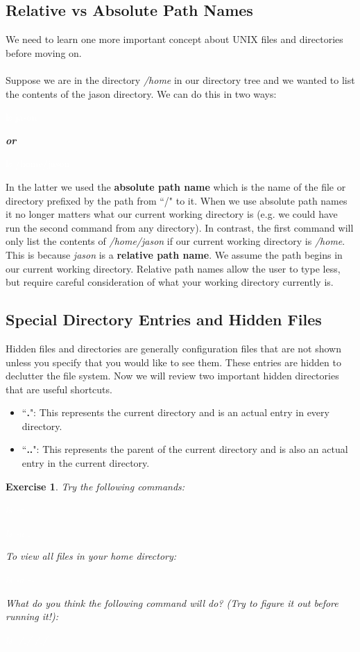\documentclass[oneside]{book}
\newcommand{\commandline}[1]{\begin{center} \colorbox{Dark}{\textcolor{white}{#1}} \end{center}}
\newtheorem{ex}{Exercise}[chapter]
\begin{document}
\subsection{Relative vs Absolute Path Names}
We need to learn one more important concept about UNIX files and directories before moving on. \\\\
Suppose we are in the directory \textit{/home} in our directory tree and we wanted to list the contents of the jason directory. We can do this in two ways:

\commandline{ls jason}
\begin{center}
    \textbf{\textit{or}}
\end{center}
\commandline{ls /home/jason}
In the latter we used the \textbf{absolute path name} which is the name of the file or directory prefixed by the path from ``/" to it. When we use absolute path names it no longer matters what our current working directory is (e.g. we could have run the second command from any directory). In contrast, the first command will only list the contents of \textit{/home/jason} if our current working directory is \textit{/home}. This is because \textit{jason} is a \textbf{relative path name}. We assume the path begins in our current working directory. Relative path names allow the user to type less, but require careful consideration of what your working directory currently is. 

\subsection{Special Directory Entries and Hidden Files}

Hidden files and directories are generally configuration files that are not shown unless you specify that you would like to see them. These entries are hidden to declutter the file system. Now we will review two important hidden directories that are useful shortcuts.

\begin{itemize}
	\item ``\textbf{.}": This represents the current directory and is an actual entry in every directory.
	\item ``\textbf{..}": This represents the parent of the current directory and is also an actual entry in the current directory.
\end{itemize}
\vspace{0.3cm}
\begin{ex}
	Try the following commands:
	\commandline{ls -a}
	\commandline{ls -a .}
To view all files in your home directory:
	\commandline{ls -a $\sim$}

What do you think the following command will do? (Try to figure it out before running it!):
	\commandline{ls ././././}
\end{ex}
\end{document}
